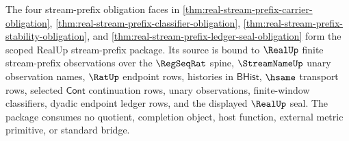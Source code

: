 \begin{theorem}
\label{thm:realup-stream-prefix-scoped-obligation-package}
The four stream-prefix obligation faces in
\autoref{thm:real-stream-prefix-carrier-obligation},
\autoref{thm:real-stream-prefix-classifier-obligation},
\autoref{thm:real-stream-prefix-stability-obligation}, and
\autoref{thm:real-stream-prefix-ledger-seal-obligation} form the scoped
RealUp stream-prefix package. Its source is bound to $\RealUp$ finite
stream-prefix observations over the $\RegSeqRat$ spine, $\StreamNameUp$ unary
observation names, $\RatUp$ endpoint rows, histories in $\mathsf{BHist}$,
$\hsame$ transport rows, selected $\mathsf{Cont}$ continuation rows, unary
observations, finite-window classifiers, dyadic endpoint ledger rows, and the
displayed $\RealUp$ seal. The package consumes no quotient, completion object,
host function, external metric primitive, or standard bridge.
\end{theorem}
